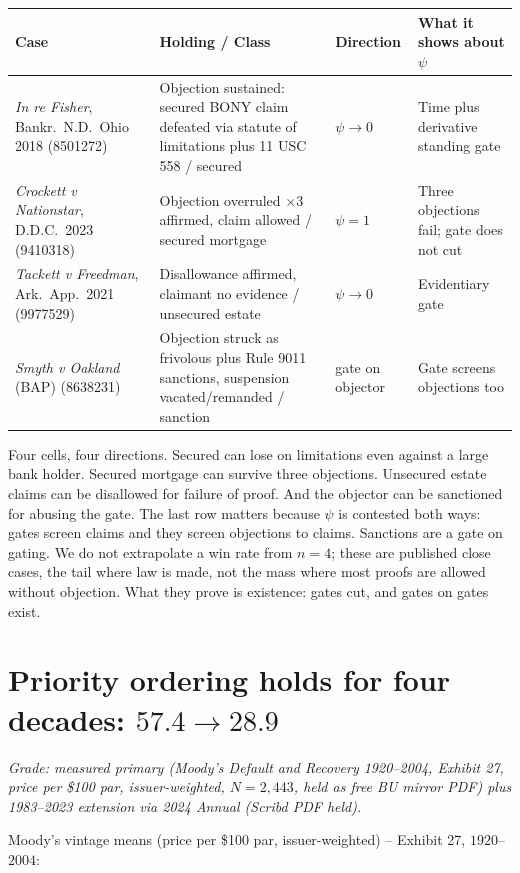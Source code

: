 \begin{center}
\small
\begin{tabular}{p{3.2cm}p{3.8cm}p{1.9cm}p{3.6cm}}
\toprule
Case & Holding / Class & Direction & What it shows about $\psi$ \\
\midrule
\textit{In re Fisher}, Bankr.\ N.D.\ Ohio 2018 (8501272) & Objection sustained: secured BONY claim defeated via statute of limitations plus 11 USC 558 / secured & $\psi\to 0$ & Time plus derivative standing gate \\
\textit{Crockett v Nationstar}, D.D.C.\ 2023 (9410318) & Objection overruled $\times 3$ affirmed, claim allowed / secured mortgage & $\psi=1$ & Three objections fail; gate does not cut \\
\textit{Tackett v Freedman}, Ark.\ App.\ 2021 (9977529) & Disallowance affirmed, claimant no evidence / unsecured estate & $\psi\to 0$ & Evidentiary gate \\
\textit{Smyth v Oakland} (BAP) (8638231) & Objection struck as frivolous plus Rule 9011 sanctions, suspension vacated/remanded / sanction & gate on objector & Gate screens objections too \\
\bottomrule
\end{tabular}
\end{center}

Four cells, four directions. Secured can lose on limitations even against a large bank holder. Secured mortgage can survive three objections. Unsecured estate claims can be disallowed for failure of proof. And the objector can be sanctioned for abusing the gate. The last row matters because $\psi$ is contested both ways: gates screen claims and they screen objections to claims. Sanctions are a gate on gating. We do not extrapolate a win rate from $n=4$; these are published close cases, the tail where law is made, not the mass where most proofs are allowed without objection. What they prove is existence: gates cut, and gates on gates exist.

\section{Priority ordering holds for four decades: $57.4\to 28.9$}
\label{sec:moodys-vintage}

\textit{Grade: measured primary (Moody's Default and Recovery 1920--2004, Exhibit 27, price per \$100 par, issuer-weighted, $N=2{,}443$, held as free BU mirror PDF) plus 1983--2023 extension via 2024 Annual (Scribd PDF held).}

Moody's vintage means (price per \$100 par, issuer-weighted) -- Exhibit 27, $1920$--$2004$:

